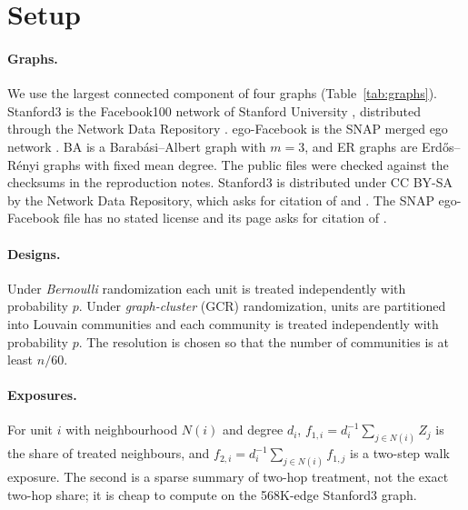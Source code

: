 \documentclass{article}
\begin{document}
\section{Setup}
\label{sec:setup}
\paragraph{Graphs.} We use the largest connected component of four graphs (Table~\ref{tab:graphs}). Stanford3 is the Facebook100 network of Stanford University \citep{traud2012}, distributed through the Network Data Repository \citep{rossi2015}. ego-Facebook is the SNAP merged ego network \citep{mcauley2012}. BA is a Barab\'asi--Albert graph with $m=3$, and ER graphs are Erd\H{o}s--R\'enyi graphs with fixed mean degree. The public files were checked against the checksums in the reproduction notes. Stanford3 is distributed under CC BY-SA by the Network Data Repository, which asks for citation of \citet{rossi2015} and \citet{traud2012}. The SNAP ego-Facebook file has no stated license and its page asks for citation of \citet{mcauley2012}.

\begin{table}[t]
\caption{Graphs (largest connected component). Clustering is the average local clustering coefficient. Clusters are the Louvain communities used for graph-cluster randomization and for CR1.}
\label{tab:graphs}
\centering
\small

\end{table}

\paragraph{Designs.} Under \emph{Bernoulli} randomization each unit is treated independently with probability $p$. Under \emph{graph-cluster} (GCR) randomization, units are partitioned into Louvain communities \citep{blondel2008} and each community is treated independently with probability $p$. The resolution is chosen so that the number of communities is at least $n/60$.

\paragraph{Exposures.} For unit $i$ with neighbourhood $N(i)$ and degree $d_i$, $f_{1,i}=d_i^{-1}\sum_{j\in N(i)} Z_j$ is the share of treated neighbours, and $f_{2,i}=d_i^{-1}\sum_{j\in N(i)} f_{1,j}$ is a two-step walk exposure. The second is a sparse summary of two-hop treatment, not the exact two-hop share; it is cheap to compute on the 568K-edge Stanford3 graph.
\end{document}
